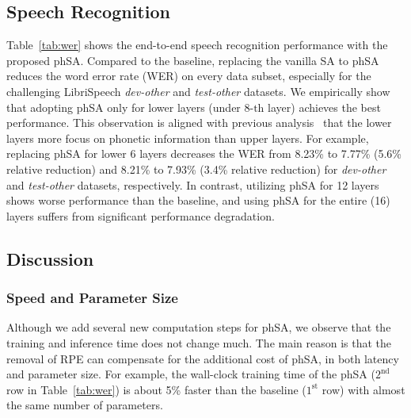\subsection{Speech Recognition}\label{ssec:asr}

Table~\ref{tab:wer} shows the end-to-end speech recognition performance with the proposed phSA.
Compared to the baseline, replacing the vanilla SA to phSA reduces the word error rate (WER) on every data subset, especially for the challenging LibriSpeech \textit{dev-other} and \textit{test-other} datasets.
We empirically show that adopting phSA only for lower layers (under $8\text{-th}$ layer) achieves the best performance.
This observation is aligned with previous analysis~\cite{understanding} that the lower layers more focus on phonetic information than upper layers.
For example, replacing phSA for lower 6 layers decreases the WER from 8.23\% to 7.77\% (5.6\% relative reduction) and 8.21\% to 7.93\% (3.4\% relative reduction) for \textit{dev-other} and \textit{test-other} datasets, respectively.
In contrast, utilizing phSA for 12 layers shows worse performance than the baseline, and using phSA for the entire (16) layers suffers from significant performance degradation.


\subsection{Discussion}\label{ssec:discussion}

\subsubsection{Speed and Parameter Size}

Although we add several new computation steps for phSA, we observe that the training and inference time does not change much.
The main reason is that the removal of RPE can compensate for the additional cost of phSA, in both latency and parameter size.
For example, the wall-clock training time of the phSA ($2^\text{nd}$ row in Table~\ref{tab:wer}) is about 5\% faster than the baseline ($1^\text{st}$ row) with almost the same number of parameters.


